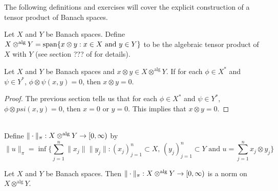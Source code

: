 \documentclass{book}
\begin{document}
	
	\begin{note}
	The following definitions and exercises will cover the explicit construction of a tensor product of Banach spaces.
	\end{note}	
	
	\begin{defn}
	Let $X$ and $Y$ be Banach spaces. Define $X \otimes^{\text{alg}} Y = \operatorname{span} \{ x \otimes y: x \in X \text{ and } y \in Y \}$ to be the algebraic tensor product of $X$ with $Y$ (see section ??? of \cite{algebra} for details). 
	\end{defn}
	
	\begin{ex}
	Let $X$ and $Y$ be Banach spaces and $x \otimes y \in X \otimes^{\text{alg}} Y$. If for each $\phi \in X^*$ and $\psi \in Y^*$, $\phi \otimes \psi(x,y) = 0$, then $x \otimes y = 0$.
	\end{ex}
	
	\begin{proof}
	The previous section tells us that for each $\phi \in X^*$ and $\psi \in Y^*$, $\phi \otimes psi(x,y) = 0$, then $x = 0$ or $y = 0$. This implies that $x \otimes y = 0$.
	\end{proof}
	
	\begin{defn} \\
	Define $\|\cdot \|_{\pi}:X \otimes^{\text{alg}} Y \rightarrow [0,\infty)$ by $$\|u\|_{\pi} = \inf \bigg \{ \sum_{j=1}^n \|x_j\| \|y_j\|: (x_j)_{j=1}^n \subset X \text{, }  (y_j)_{j=1}^n \subset Y \text{ and } u = \sum_{j=1}^n x_j \otimes y_j  \bigg \}$$
	\end{defn}
	
	\begin{ex}
	Let $X$ and $Y$ be Banach spaces. Then $\| \cdot \|_{\pi}: X \otimes^{\text{alg}} Y \rightarrow [0,\infty)$ is a norm on $X \otimes^{\text{alg}} Y$.
	\end{ex}
	
\end{document}
